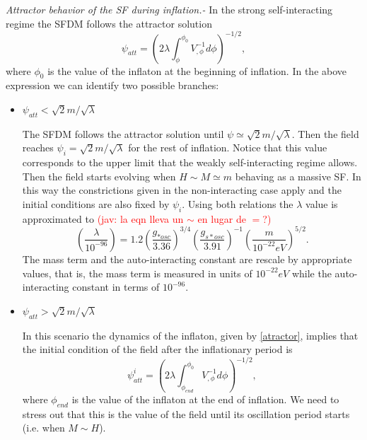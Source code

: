 \documentclass[amssymb,twocolumn,prd,nofootinbib,showpacs]{revtex4-1}
\newcommand{\jav}[1]{\textcolor{red}{(jav: #1)}}
\begin{document}
\textit{Attractor behavior of the SF during inflation.-} In the strong self-interacting regime the SFDM follows the attractor solution \cite{curvatonatractor}
\begin{equation}\label{atractor}
\psi_{att} =\left(2\lambda\int_{\phi}^{\phi_0}V^{-1}_{,\phi}d\phi\right)^{-1/2},
\end{equation}
where $\phi_0$ is the value of the inflaton at the beginning of inflation. 
In the above expression we can identify two possible branches:
\begin{itemize}
\item $\psi_{att}<\sqrt{2}m/\sqrt{\lambda}$

The SFDM follows the attractor solution until $\psi\simeq \sqrt{2}m/\sqrt{\lambda}$. Then the field 
reaches $\psi_i=\sqrt{2}m/\sqrt{\lambda}$ for the rest of inflation. Notice that this value corresponds to the upper 
limit that the weakly self-interacting regime allows. 
%
Then the field starts evolving when $H\sim M\simeq m$ behaving as a massive SF. In this way the constrictions 
given in the non-interacting case apply and the initial conditions are also fixed by $\psi_i$. 
Using both relations the $\lambda$ value is approximated to \jav{la eqn lleva un $\sim$ en lugar de $=$?}
%
\begin{equation}\label{wregime}
\left(\frac{\lambda}{10^{-96}}\right)=1.2\left(\frac{g_{*osc}}{3.36}\right)^{3/4}\left(\frac{g_{s*osc}}{3.91}\right)^{-1}\left(\frac{m}{10^{-22}eV}\right)^{5/2}.
\end{equation}
%
The mass term and the auto-interacting constant are rescale by appropriate values, that is, the mass term is measured 
in units of $10^{-22}eV$ while the auto-interacting constant in terms of $10^{-96}$.
\\

\item $\psi_{att}>\sqrt{2}m/\sqrt{\lambda}$

In this scenario the dynamics of the inflaton, given by \eqref{atractor}, implies that the initial condition 
of the field after the inflationary period is
%
\begin{equation}\label{atractor2}
\psi_{att}^i = \left(2\lambda\int_{\phi_{end}}^{\phi_0}V^{-1}_{,\phi}d\phi\right)^{-1/2},
\end{equation}
%
where $\phi_{end}$ is the value of the inflaton at the end of inflation. 
We need to stress out that this is the value of the field until its oscillation period starts (i.e. when $M\sim H$).


\end{itemize}
\end{document}
